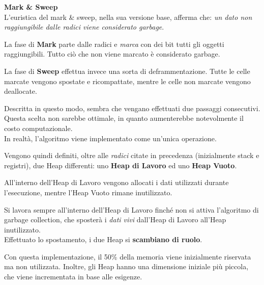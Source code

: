 \documentclass{article}
\begin{document}
\vspace{14pt}
\textbf{Mark \& Sweep}\\
L'euristica del mark \& sweep, nella sua versione base, afferma che: \textit{un dato non raggiungibile dalle radici viene considerato garbage}.

La fase di \textbf{Mark} parte dalle radici e \textit{marca} con dei bit tutti gli oggetti raggiungibili. Tutto ciò che non viene marcato è considerato garbage.

La fase di \textbf{Sweep} effettua invece una sorta di deframmentazione. Tutte le celle marcate vengono spostate e ricompattate, mentre le celle non marcate vengono deallocate.

Descritta in questo modo, sembra che vengano effettuati due passaggi consecutivi. Questa scelta non sarebbe ottimale, in quanto aumenterebbe notevolmente il costo computazionale.\\
In realtà, l'algoritmo viene implementato come un'unica operazione.

Vengono quindi definiti, oltre alle \textit{radici} citate in precedenza (inizialmente stack e registri), due Heap differenti: uno \textbf{Heap di Lavoro} ed uno \textbf{Heap Vuoto}.

All'interno dell'Heap di Lavoro vengono allocati i dati utilizzati durante l'esecuzione, mentre l'Heap Vuoto rimane inutilizzato.

Si lavora sempre all'interno dell'Heap di Lavoro finché non si attiva l'algoritmo di garbage collection, che sposterà i \textit{dati vivi} dall'Heap di Lavoro all'Heap inutilizzato.\\
Effettuato lo spostamento, i due Heap si \textbf{scambiano di ruolo}.

Con questa implementazione, il 50\% della memoria viene inizialmente riservata ma non utilizzata. Inoltre, gli Heap hanno una dimensione iniziale più piccola, che viene incrementata in base alle esigenze.
\end{document}
